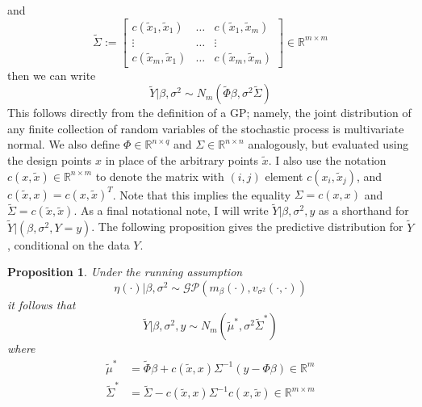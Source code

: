 \documentclass[12pt]{article}
\newcommand{\R}{\mathcal{R}}
\def\R{\mathbb{R}}
\newtheorem{prop}{Proposition}
\begin{document}
and 
\[\tilde{\Sigma} := \begin{bmatrix} c(\tilde{x}_1, \tilde{x}_1) & \hdots & c(\tilde{x}_1, \tilde{x}_m) \\
                                         \vdots & \hdots & \vdots \\
                                          c(\tilde{x}_m, \tilde{x}_1) & \hdots & c(\tilde{x}_m, \tilde{x}_m) 
                                          \end{bmatrix} \in \R^{m \times m}\]
then we can write
\[\tilde{Y}|\beta, \sigma^2 \sim N_m \left(\tilde{\Phi} \beta, \sigma^2 \tilde{\Sigma} \right)\]
This follows directly from the definition of a GP; namely, the joint distribution of any finite collection of random variables of the stochastic process is multivariate normal. 
We also define $\Phi \in \R^{n \times q}$ and $\Sigma \in \R^{n \times n}$ analogously, but evaluated using the design points $x$ in place of the arbitrary points $\tilde{x}$. 
I also use the notation $c(x, \tilde{x}) \in \R^{n \times m}$ to denote the matrix with $(i, j)$ element $c(x_i, \tilde{x}_j)$, and $c(\tilde{x}, x) = c(x, \tilde{x})^T$. Note that this implies
the equality $\Sigma = c(x, x)$ and $\tilde{\Sigma} = c(\tilde{x}, \tilde{x})$. As a final notational note, I will write $\tilde{Y}|\beta, \sigma^2, y$ as a shorthand for 
$\tilde{Y}|(\beta, \sigma^2, Y = y)$. 
The following proposition
gives the predictive distribution for $\tilde{Y}$, conditional on the data $Y$. 
\begin{prop} \label{conditional_dist}
Under the running assumption 
\[\eta(\cdot)|\beta, \sigma^2 \sim \mathcal{GP}(m_\beta (\cdot), v_{\sigma^2}(\cdot, \cdot)) \]
it follows that 
\[\tilde{Y}|\beta, \sigma^2, y \sim N_m \left(\tilde{\mu}^*, \sigma^2 \tilde{\Sigma}^* \right)\] 
where 
\begin{align*}
\tilde{\mu}^* &= \tilde{\Phi}\beta + c(\tilde{x}, x)\Sigma^{-1}(y - \Phi \beta) \in \R^m \\ 
\tilde{\Sigma}^* &= \tilde{\Sigma} - c(\tilde{x}, x) \Sigma^{-1} c(x, \tilde{x}) \in \R^{m \times m}
\end{align*}
\end{prop}
\end{document}
